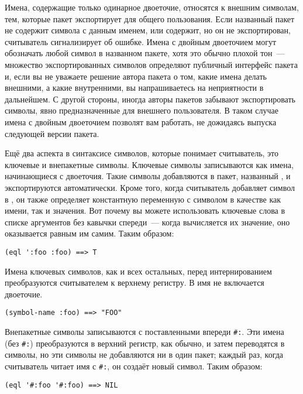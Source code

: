 Имена, содержащие только одинарное двоеточие, относятся к внешним символам, тем, которые
пакет экспортирует для общего пользования. Если названный пакет не содержит символа с
данным именем, или содержит, но он не экспортирован, считыватель сигнализирует об
ошибке. Имена с двойным двоеточием могут обозначать любой символ в названном пакете, хотя
это обычно плохой тон~--- множество экспортированных символов определяют публичный
интерфейс пакета и, если вы не уважаете решение автора пакета о том, какие имена делать
внешними, а какие внутренними, вы напрашиваетесь на неприятности в дальнейшем. С другой
стороны, иногда авторы пакетов забывают экспортировать символы, явно предназначенные для
внешнего пользователя. В таком случае имена с двойным двоеточием позволят вам работать, не
дожидаясь выпуска следующей версии пакета.

Ещё два аспекта в синтаксисе символов, которые понимает считыватель, это ключевые и
внепакетные символы. Ключевые символы записываются как имена, начинающиеся с
двоеточия. Такие символы добавляются в пакет, названный  , и экспортируются
автоматически. Кроме того, когда считыватель добавляет символ в , он также
определяет константную переменную с символом в качестве как имени, так и значения. Вот
почему вы можете использовать ключевые слова в списке аргументов без кавычки спереди~---
когда вычисляется их значение, оно оказывается равным им самим.  Таким образом:

\begin{lstlisting}
(eql ':foo :foo) ==> T
\end{lstlisting}

Имена ключевых символов, как и всех остальных, перед интернированием преобразуются
считывателем к верхнему регистру. В имя не включается двоеточие.

\begin{lstlisting}
(symbol-name :foo) ==> "FOO"
\end{lstlisting}

Внепакетные символы записываются с поставленными впереди \lstinline!#:!. Эти имена (без
\lstinline!#:!) преобразуются в верхний регистр, как обычно, и затем переводятся в
символы, но эти символы не добавляются ни в один пакет; каждый раз, когда считыватель
читает имя с \lstinline!#:!, он создаёт новый символ.  Таким образом:

\begin{lstlisting}
(eql '#:foo '#:foo) ==> NIL
\end{lstlisting}

